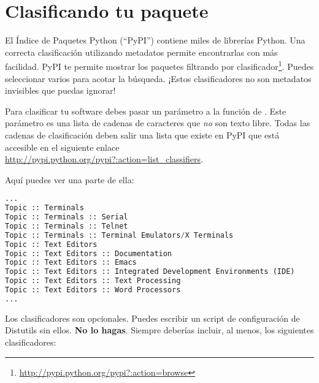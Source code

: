 \section{Clasificando tu paquete}

El Índice de Paquetes Python (``PyPI'') contiene miles de librerías Python. Una correcta clasificación utilizando metadatos permite encontrarlas con más facilidad. PyPI te permite mostrar los paquetes filtrando por clasificador\footnote{\href{http://pypi.python.org/pypi?:action=browse}{http://pypi.python.org/pypi?:action=browse}}. Puedes seleccionar varios para acotar la búsqueda. ¡Estos clasificadores no son metadatos invisibles que puedas ignorar!

Para clasificar tu software debes pasar un parámetro  a la función  de . Este parámetro es una lista de cadenas de caracteres que \emph{no} son texto libre. Todas las cadenas de clasificación deben salir una lista que existe en PyPI que está accesible en el siguiente enlace \href{http://pypi.python.org/pypi?:action=list\_classifiers}{http://pypi.python.org/pypi?:action=list\_classifiers}.

Aquí puedes ver una parte de ella:


\begin{lstlisting}[language=Python,breaklines=true]
...
Topic :: Terminals
Topic :: Terminals :: Serial
Topic :: Terminals :: Telnet
Topic :: Terminals :: Terminal Emulators/X Terminals
Topic :: Text Editors
Topic :: Text Editors :: Documentation
Topic :: Text Editors :: Emacs
Topic :: Text Editors :: Integrated Development Environments (IDE)
Topic :: Text Editors :: Text Processing
Topic :: Text Editors :: Word Processors
...
\end{lstlisting}

Los clasificadores son opcionales. Puedes escribir un script de configuración de Distutils sin ellos. \textbf{No lo hagas}. Siempre deberías incluir, al menos, los siguientes clasificadores:


